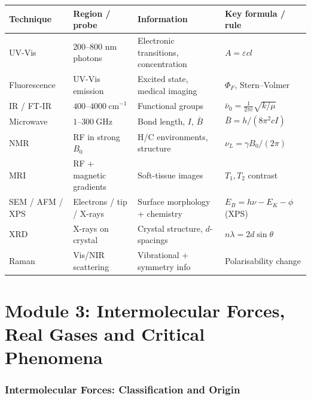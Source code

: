 \documentclass[12pt,a4paper]{article}
\newcommand{\moduletitle}{Combined Notes}
\begin{document}
\begin{tcolorbox}[tikzbox, title={Summary Reference Table of Spectroscopic Techniques}]
\begin{tabularx}{\linewidth}{|B{3.0cm}|Y|Y|Y|}
\hline
\textbf{Technique} & \textbf{Region / probe} & \textbf{Information} & \textbf{Key formula / rule} \\
\hline
UV-Vis & 200--800 nm photons & Electronic transitions, concentration & $A=\varepsilon c l$ \\
\hline
Fluorescence & UV-Vis emission & Excited state, medical imaging & $\Phi_F$, Stern--Volmer \\
\hline
IR / FT-IR & $400$--$4000\ \mathrm{cm^{-1}}$ & Functional groups & $\bar{\nu}_0=\frac{1}{2\pi c}\sqrt{k/\mu}$ \\
\hline
Microwave & $1$--$300\ \mathrm{GHz}$ & Bond length, $I$, $\bar{B}$ & $\bar{B}=h/(8\pi^{2}cI)$ \\
\hline
NMR & RF in strong $B_0$ & H/C environments, structure & $\nu_L=\gamma B_0/(2\pi)$ \\
\hline
MRI & RF + magnetic gradients & Soft-tissue images & $T_1, T_2$ contrast \\
\hline
SEM / AFM / XPS & Electrons / tip / X-rays & Surface morphology + chemistry & $E_B=h\nu-E_K-\phi$ (XPS) \\
\hline
XRD & X-rays on crystal & Crystal structure, $d$-spacings & $n\lambda=2d\sin\theta$ \\
\hline
Raman & Vis/NIR scattering & Vibrational + symmetry info & Polarisability change \\
\hline
\end{tabularx}
\end{tcolorbox}

\newpage
\renewcommand{\moduletitle}{Module 3 --- Intermolecular Forces}
\part{Module 3: Intermolecular Forces, Real Gases and Critical Phenomena}
\setcounter{section}{0}

\section{Intermolecular Forces: Classification and Origin}
\end{document}
